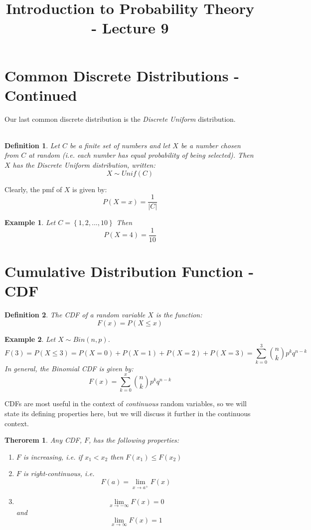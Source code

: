 \documentclass[12pt]{article} %
\date{}
\title{Introduction to Probability Theory - Lecture 9}
\newtheorem{defn}{Definition}
\newtheorem{example}{Example}
\newtheorem{thm}{Therorem}
\begin{document}
\maketitle
\section{Common Discrete Distributions - Continued}
Our last common discrete distribution is the \emph{Discrete Uniform} distribution.\\\\
\begin{defn}
Let $C$ be a finite set of numbers and let $X$ be a number chosen from $C$ at random (i.e. each number has equal probability of being selected). Then $X$ has the \emph{Discrete Uniform} distribution, written:
$$X\sim Unif(C)$$
\end{defn}
Clearly, the pmf of $X$ is given by:
$$P(X=x) = \frac1{|C|}$$
\begin{example}
Let $C =\left\{1,2,...,10\right\}$ Then
$$P(X=4) = \frac1{10}$$
\end{example}
\section{Cumulative Distribution Function - CDF}
\begin{defn}
The CDF of a random variable $X$ is the function:
$$F(x) = P(X\leq x)$$
\end{defn}
\begin{example}
Let $X\sim Bin(n,p)$.
$$F(3) = P(X\leq 3) = P(X=0)+P(X=1)+P(X=2)+P(X=3) = \sum_{k=0}^3{n\choose{k}}p^kq^{n-k}$$
In general, the Binomial CDF is given by:
$$F(x) = \sum_{k=0}^x {n\choose{k}}p^kq^{n-k}$$
\end{example}
CDFs are most useful in the context of \emph{continuous} random variables, so we will state its defining properties here, but we will discuss it further in the continuous context.
\begin{thm}
Any CDF, $F$, has the following properties:
\begin{enumerate}
\item $F$ is increasing, i.e. if $x_1<x_2$ then $F(x_1)\leq F(x_2)$
\item $F$ is right-continuous, i.e.
$$F(a) = \lim_{x\rightarrow a^+} F(x)$$
\item 
$$\lim_{x\rightarrow -\infty} F(x) = 0$$
and
$$\lim_{x\rightarrow\infty} F(x) = 1$$
\end{enumerate}
\end{thm}
\end{document}
